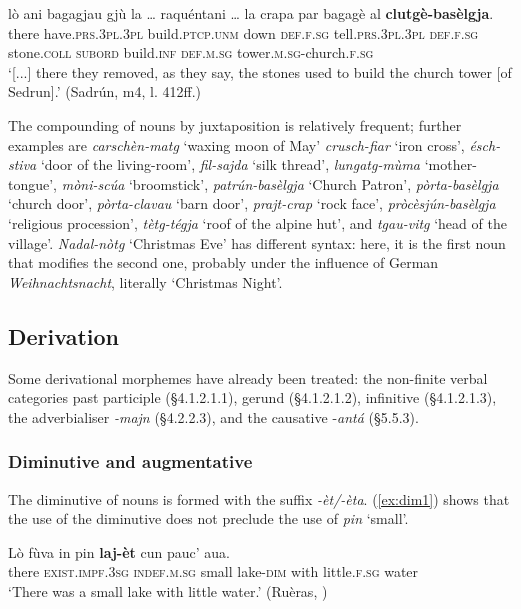 \ea
\label{ex:clutgebaselgja1}
\gll[...] lò ani bagagjau gjù la … raquéntani … la crapa par bagagè al \textbf{clutgè-basèlgja}.\\
{} there have.\textsc{prs.3pl.3pl} build.\textsc{ptcp.unm} down \textsc{def.f.sg} {} tell.\textsc{prs.3pl.3pl} {} \textsc{def.f.sg} stone.\textsc{coll} \textsc{subord} build.\textsc{inf}  \textsc{def.m.sg} tower.\textsc{m.sg}-church.\textsc{f.sg}  \\
\glt `[...] there they removed, as they say, the stones used to build the church tower [of Sedrun].' (Sadrún, m4, l. 412ff.)
\z

The compounding of nouns by juxtaposition is relatively frequent; further examples are \textit{carschèn-matg} `waxing moon of May' \textit{crusch-fiar} `iron cross', \textit{ésch-stiva} `door of the living-room', \textit{fil-sajda} `silk thread', \textit{lungatg-mùma} `mother-tongue', \textit{mòni-scúa} `broomstick', \textit{patrún-basèlgja} `Church Patron', \textit{pòrta-basèlgja} `church door', \textit{pòrta-clavau} `barn door', \textit{prajt-crap} `rock face', \textit{pròcèsjún-basèlgja} `religious procession', \textit{tètg-tégja} `roof of the alpine hut', and \textit{tgau-vitg} `head of the village'. \textit{Nadal-nòtg} `Christmas Eve' has different syntax: here, it is the first noun that modifies the second one, probably under the influence of German \textit{Weihnachtsnacht}, literally `Christmas Night'.

\subsection{Derivation}
Some derivational morphemes have already been treated: the non-finite verbal categories past participle (§4.1.2.1.1), gerund (§4.1.2.1.2), infinitive (§4.1.2.1.3), the adverbialiser \textit{-majn} (§4.2.2.3), and the causative -\textit{antá} (§5.5.3).


\subsubsection{Diminutive and augmentative}
The diminutive of nouns is formed with the suffix \textit{-èt/-èta}. (\ref{ex:dim1}) shows that the use of the diminutive does not preclude the use of \textit{pin} `small'.

\ea\label{ex:dim1}
\gll    Lò fùva in pin \textbf{laj-èt} cun pauc’ aua.\\
     there \textsc{exist.impf.3sg} \textsc{indef.m.sg} small lake-\textsc{dim} with little.\textsc{f.sg} water \\
\glt `There was a small lake with little water.' (Ruèras, \citealt[62]{Büchli1966})
\z

